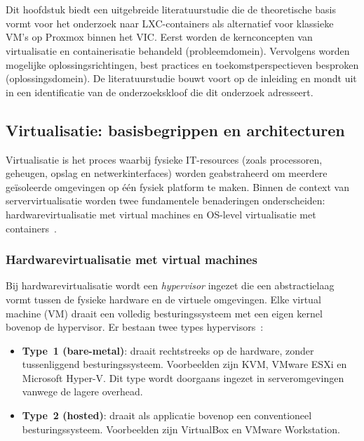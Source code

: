 \chapter{}%
\label{ch:stand-van-zaken}

Dit hoofdstuk biedt een uitgebreide literatuurstudie die de theoretische basis vormt voor het onderzoek naar LXC-containers als alternatief voor klassieke VM's op Proxmox binnen het VIC. Eerst worden de kernconcepten van virtualisatie en containerisatie behandeld (probleemdomein). Vervolgens worden mogelijke oplossingsrichtingen, best practices en toekomstperspectieven besproken (oplossingsdomein). De literatuurstudie bouwt voort op de inleiding en mondt uit in een identificatie van de onderzoekskloof die dit onderzoek adresseert.

\section{Virtualisatie: basisbegrippen en architecturen}
\label{sec:virtualisatie-basisbegrippen}

Virtualisatie is het proces waarbij fysieke IT-resources (zoals processoren, geheugen, opslag en netwerkinterfaces) worden geabstraheerd om meerdere geïsoleerde omgevingen op één fysiek platform te maken. Binnen de context van servervirtualisatie worden twee fundamentele benaderingen onderscheiden: hardwarevirtualisatie met virtual machines en OS-level virtualisatie met containers~\autocite{Felter2015}.

\subsection{Hardwarevirtualisatie met virtual machines}
\label{subsec:hardware-virtualisatie}

Bij hardwarevirtualisatie wordt een \textit{hypervisor} ingezet die een abstractielaag vormt tussen de fysieke hardware en de virtuele omgevingen. Elke virtual machine (VM) draait een volledig besturingssysteem met een eigen kernel bovenop de hypervisor. Er bestaan twee types hypervisors~\autocite{Sharma2016}:

\begin{itemize}
    \item \textbf{Type~1 (bare-metal)}: draait rechtstreeks op de hardware, zonder tussenliggend besturingssysteem. Voorbeelden zijn KVM, VMware ESXi en Microsoft Hyper-V. Dit type wordt doorgaans ingezet in serveromgevingen vanwege de lagere overhead.
    \item \textbf{Type~2 (hosted)}: draait als applicatie bovenop een conventioneel besturingssysteem. Voorbeelden zijn VirtualBox en VMware Workstation.
\end{itemize}


